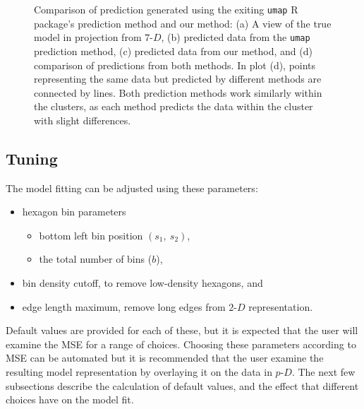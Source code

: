 \documentclass[
  12pt]{article}
\providecommand{\tightlist}{%
  \setlength{\itemsep}{0pt}\setlength{\parskip}{0pt}}\usepackage{longtable,booktabs,array}
\def\tightlist{}
\newcommand\pD{$p\text{-}D$}
\newcommand\gD{$2\text{-}D$}
\begin{document}
\begin{figure}[H]


\caption{\label{fig-predict-two-curvy}Comparison of prediction generated
using the exiting \texttt{umap} R package's prediction method and our
method: (a) A view of the true model in projection from \(7\text{-}D\),
(b) predicted data from the \texttt{umap} prediction method, (c)
predicted data from our method, and (d) comparison of predictions from
both methods. In plot (d), points representing the same data but
predicted by different methods are connected by lines. Both prediction
methods work similarly within the clusters, as each method predicts the
data within the cluster with slight differences.}

\end{figure}%

\subsection{Tuning}\label{tuning}

The model fitting can be adjusted using these parameters:

\begin{itemize}
\tightlist
\item
  hexagon bin parameters

  \begin{itemize}
  \tightlist
  \item
    bottom left bin position \((s_1, \ s_2)\),
  \item
    the total number of bins (\(b\)),
  \end{itemize}
\item
  bin density cutoff, to remove low-density hexagons, and
\item
  edge length maximum, remove long edges from \gD{} representation.
\end{itemize}

Default values are provided for each of these, but it is expected that
the user will examine the MSE for a range of choices. Choosing these
parameters according to MSE can be automated but it is recommended that
the user examine the resulting model representation by overlaying it on
the data in \pD{}. The next few subsections describe the calculation of
default values, and the effect that different choices have on the model
fit.
\end{document}
